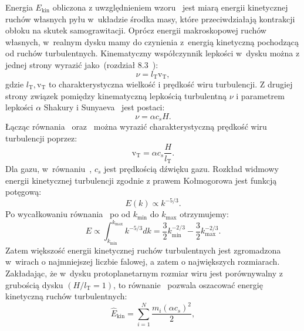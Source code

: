 Energia $E_{\textrm{kin}}$ obliczona z uwzględnieniem wzoru~
jest miarą energii kinetycznej ruchów własnych pyłu w~układzie środka masy,
które przeciwdziałają kontrakcji obłoku na skutek samograwitacji.  Oprócz
energii makroskopowej ruchów własnych, w~realnym dysku mamy do czynienia
z~energią kinetyczną pochodzącą od ruchów turbulentnych.  Kinematyczny
współczynnik lepkości w~dysku można z jednej strony wyrazić jako~(rozdział
8.3~\cite{C98}):
%
\begin{equation}
   \nu = l_{\textrm{T}} \textrm{v}_{\textrm{T}},
   \label{eq:nu1}
\end{equation}
%
gdzie $l_{\textrm{T}}, \textrm{v}_{\textrm{T}}$ to charakterystyczna wielkość i prędkość
wiru turbulencji. Z drugiej strony 
związek pomiędzy kinematyczną lepkością turbulentną $\nu$ i parametrem lepkości
$\alpha$ Shakury i Sunyaeva~\cite{SS73} jest postaci:
%
\begin{equation}
   \nu = \alpha c_s H.
   \label{eq:nu2}
\end{equation}
%
Łącząc równania~ oraz~ można wyrazić charakterystyczną
prędkość wiru turbulencji poprzez:
%
\begin{equation}
   \textrm{v}_{\textrm{T}} = \alpha c_s \frac{H}{l_{\textrm{T}}}.
   \label{eq:velt}
\end{equation}
%
Dla gazu, w~równaniu~, $c_s$ jest prędkością dźwięku gazu.
Rozkład widmowy energii kinetycznej turbulencji zgodnie z prawem Kołmogorowa
jest funkcją potęgową:
\begin{equation}
   E(k) \propto k^{-5/3}.
   \label{eq:ek}
\end{equation}
Po wycałkowaniu równania~ po od $k_\textrm{min}$ do $k_\textrm{max}$
otrzymujemy:
\begin{equation}
   E \propto \int_{k_\textrm{min}}^{k_\textrm{max}} k^{-5/3} dk = \frac{3}{2}
   k_\textrm{min}^{-2/3} -\frac{3}{2}k_\textrm{max}^{-2/3}.
\end{equation}
Zatem większość energii kinetycznej ruchów turbulentnych jest zgromadzona w~wirach
o najmniejszej liczbie falowej, a zatem o największych rozmiarach. Zakładając,
że w~dysku protoplanetarnym rozmiar wiru jest porównywalny z grubością dysku $(H
/ l_{\textrm{T}} = 1)$, to równanie~ pozwala oszacować energię 
kinetyczną ruchów turbulentnych:
\begin{equation}
   \hat{E}_{\textrm{kin}} = \sum\limits_{i=1}^N \frac{m_i \left(\alpha
   c_s\right)^2}{2},
   \label{eq:ekinturb}
\end{equation}
